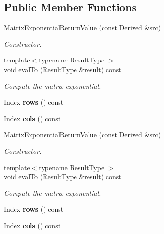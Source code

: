 \subsection*{Public Member Functions}
\begin{DoxyCompactItemize}
\item 
\hyperlink{struct_eigen_1_1_matrix_exponential_return_value_a4048419b1ee2befc51564703ba11acab}{Matrix\+Exponential\+Return\+Value} (const Derived \&src)
\begin{DoxyCompactList}\small\item\em Constructor. \end{DoxyCompactList}\item 
{\footnotesize template$<$typename Result\+Type $>$ }\\void \hyperlink{struct_eigen_1_1_matrix_exponential_return_value_a3dd2c65c7c6cdc41ab17415ee11899a0}{eval\+To} (Result\+Type \&result) const
\begin{DoxyCompactList}\small\item\em Compute the matrix exponential. \end{DoxyCompactList}\item 
\mbox{\label{struct_eigen_1_1_matrix_exponential_return_value_a79e39d9a80c94d30122b82c71523a950}} 
Index {\bfseries rows} () const
\item 
\mbox{\label{struct_eigen_1_1_matrix_exponential_return_value_af817682d9e7d860f799bbe3b6b749eb3}} 
Index {\bfseries cols} () const
\item 
\hyperlink{struct_eigen_1_1_matrix_exponential_return_value_a4048419b1ee2befc51564703ba11acab}{Matrix\+Exponential\+Return\+Value} (const Derived \&src)
\begin{DoxyCompactList}\small\item\em Constructor. \end{DoxyCompactList}\item 
{\footnotesize template$<$typename Result\+Type $>$ }\\void \hyperlink{struct_eigen_1_1_matrix_exponential_return_value_a3dd2c65c7c6cdc41ab17415ee11899a0}{eval\+To} (Result\+Type \&result) const
\begin{DoxyCompactList}\small\item\em Compute the matrix exponential. \end{DoxyCompactList}\item 
\mbox{\label{struct_eigen_1_1_matrix_exponential_return_value_a79e39d9a80c94d30122b82c71523a950}} 
Index {\bfseries rows} () const
\item 
\mbox{\label{struct_eigen_1_1_matrix_exponential_return_value_af817682d9e7d860f799bbe3b6b749eb3}} 
Index {\bfseries cols} () const
\end{DoxyCompactItemize}
